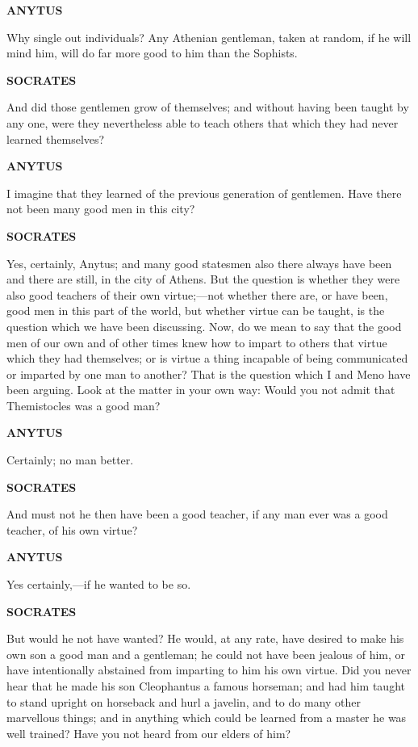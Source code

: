 \documentclass[11pt,letter]{article}
\begin{document}
\par \textbf{ANYTUS}
\par   Why single out individuals? Any Athenian gentleman, taken at random, if he will mind him, will do far more good to him than the Sophists.

\par \textbf{SOCRATES}
\par   And did those gentlemen grow of themselves; and without having been taught by any one, were they nevertheless able to teach others that which they had never learned themselves?

\par \textbf{ANYTUS}
\par   I imagine that they learned of the previous generation of gentlemen. Have there not been many good men in this city?

\par \textbf{SOCRATES}
\par   Yes, certainly, Anytus; and many good statesmen also there always have been and there are still, in the city of Athens. But the question is whether they were also good teachers of their own virtue;—not whether there are, or have been, good men in this part of the world, but whether virtue can be taught, is the question which we have been discussing. Now, do we mean to say that the good men of our own and of other times knew how to impart to others that virtue which they had themselves; or is virtue a thing incapable of being communicated or imparted by one man to another? That is the question which I and Meno have been arguing. Look at the matter in your own way:  Would you not admit that Themistocles was a good man?

\par \textbf{ANYTUS}
\par   Certainly; no man better.

\par \textbf{SOCRATES}
\par   And must not he then have been a good teacher, if any man ever was a good teacher, of his own virtue?

\par \textbf{ANYTUS}
\par   Yes certainly,—if he wanted to be so.

\par \textbf{SOCRATES}
\par   But would he not have wanted? He would, at any rate, have desired to make his own son a good man and a gentleman; he could not have been jealous of him, or have intentionally abstained from imparting to him his own virtue. Did you never hear that he made his son Cleophantus a famous horseman; and had him taught to stand upright on horseback and hurl a javelin, and to do many other marvellous things; and in anything which could be learned from a master he was well trained? Have you not heard from our elders of him?
\end{document}
